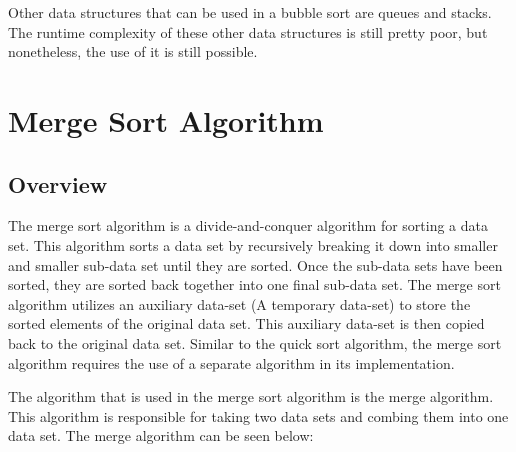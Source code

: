 \documentclass[a4paper,9pt]{article}
\begin{document}
\noindent Other data structures that can be used in a bubble sort are queues and stacks. The runtime complexity of these other data structures is still pretty poor, but nonetheless, the use of it is still possible. 

\clearpage

\section*{Merge Sort Algorithm}

\subsection*{Overview}

The merge sort algorithm is a divide-and-conquer algorithm for sorting a data set. This algorithm sorts a data set by recursively breaking it down into smaller and smaller sub-data set until they are sorted. Once the sub-data sets have been sorted, they are sorted back together into one final sub-data set. The merge sort algorithm utilizes
an auxiliary data-set (A temporary data-set) to store the sorted elements of the original data set. This auxiliary data-set is then copied back to the original data set. Similar to the quick sort algorithm, the merge sort algorithm requires the use of a separate algorithm in its implementation.

The algorithm that is used in the merge sort algorithm is the merge algorithm. This algorithm is responsible for taking two data sets and combing them into one data set. The merge algorithm can be seen below:
\end{document}
